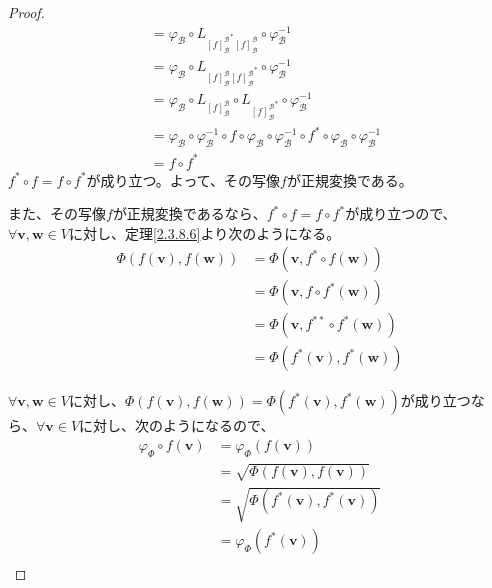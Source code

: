\documentclass[dvipdfmx]{jsarticle}
\begin{document}
\begin{proof}
\begin{align*}
&= \varphi_{\mathcal{B}} \circ L_{{[ f]_{\mathcal{B}}^{\mathcal{B}}}^{*}[ f]_{\mathcal{B}}^{\mathcal{B}}} \circ \varphi_{\mathcal{B}}^{- 1}\\
&= \varphi_{\mathcal{B}} \circ L_{[ f]_{\mathcal{B}}^{\mathcal{B}}{[ f]_{\mathcal{B}}^{\mathcal{B}}}^{*}} \circ \varphi_{\mathcal{B}}^{- 1}\\
&= \varphi_{\mathcal{B}} \circ L_{[ f]_{\mathcal{B}}^{\mathcal{B}}} \circ L_{{[ f]_{\mathcal{B}}^{\mathcal{B}}}^{*}} \circ \varphi_{\mathcal{B}}^{- 1}\\
&= \varphi_{\mathcal{B}} \circ \varphi_{\mathcal{B}}^{- 1} \circ f \circ \varphi_{\mathcal{B}} \circ \varphi_{\mathcal{B}}^{- 1} \circ f^{*} \circ \varphi_{\mathcal{B}} \circ \varphi_{\mathcal{B}}^{- 1}\\
&= f \circ f^{*}
\end{align*}
$f^{*} \circ f = f \circ f^{*}$が成り立つ。よって、その写像$f$が正規変換である。\par
また、その写像$f$が正規変換であるなら、$f^{*} \circ f = f \circ f^{*}$が成り立つので、$\forall\mathbf{v},\mathbf{w} \in V$に対し、定理\ref{2.3.8.6}より次のようになる。
\begin{align*}
\varPhi\left( f\left( \mathbf{v} \right),f\left( \mathbf{w} \right) \right) &= \varPhi\left( \mathbf{v},f^{*} \circ f\left( \mathbf{w} \right) \right)\\
&= \varPhi\left( \mathbf{v},f \circ f^{*}\left( \mathbf{w} \right) \right)\\
&= \varPhi\left( \mathbf{v},f^{**} \circ f^{*}\left( \mathbf{w} \right) \right)\\
&= \varPhi\left( f^{*}\left( \mathbf{v} \right),f^{*}\left( \mathbf{w} \right) \right)
\end{align*}\par
$\forall\mathbf{v},\mathbf{w} \in V$に対し、$\varPhi\left( f\left( \mathbf{v} \right),f\left( \mathbf{w} \right) \right) = \varPhi\left( f^{*}\left( \mathbf{v} \right),f^{*}\left( \mathbf{w} \right) \right)$が成り立つなら、$\forall\mathbf{v} \in V$に対し、次のようになるので、
\begin{align*}
\varphi_{\varPhi} \circ f\left( \mathbf{v} \right) &= \varphi_{\varPhi}\left( f\left( \mathbf{v} \right) \right)\\
&= \sqrt{\varPhi\left( f\left( \mathbf{v} \right),f\left( \mathbf{v} \right) \right)}\\
&= \sqrt{\varPhi\left( f^{*}\left( \mathbf{v} \right),f^{*}\left( \mathbf{v} \right) \right)}\\
&= \varphi_{\varPhi}\left( f^{*}\left( \mathbf{v} \right) \right)\\

\end{align*}
\end{proof}
\end{document}
